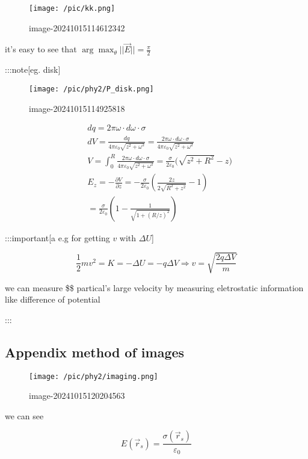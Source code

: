 \documentclass[
]{article}
\begin{document}
\begin{figure}
\centering
\texttt{[image: /pic/kk.png]}
\caption{image-20241015114612342}
\end{figure}

it's easy to see that \(\arg \max_{\theta } ||\vec E||=\frac{\pi}{2}\)

:::note{[}eg. disk{]}

\begin{figure}
\centering
\texttt{[image: /pic/phy2/P\_disk.png]}
\caption{image-20241015114925818}
\end{figure}

\[
\begin{aligned}
&dq=2\pi\omega\cdot d\omega\cdot\sigma \\
&dV=\frac{dq}{4\pi\varepsilon_{0}\sqrt{z^{2}+\omega^{2}}}=\frac{2\pi\omega\cdot d\omega\cdot\sigma}{4\pi\varepsilon_{0}\sqrt{z^{2}+\omega^{2}}} \\
&V=\int_{0}^{R}\frac{2\pi\omega\cdot d\omega\cdot\sigma}{4\pi\varepsilon_{0}\sqrt{z^{2}+\omega^{2}}}=\frac{\sigma}{2\varepsilon_{0}}\big(\sqrt{z^{2}+R^{2}}-z\big) \\
&E_{z}=-\frac{\partial V}{\partial z}=-\frac{\sigma}{2\varepsilon_{0}}(\frac{2z}{2\sqrt{R^{2}+z^{2}}}-1) \\
&=\frac{\sigma}{2\varepsilon_{0}}(1-\frac{1}{\sqrt{1+(R/z)^{2}}})
\end{aligned}
\]

:::important{[}a e.g for getting \(v\) with \(\Delta U\){]}

\[
\frac{1}{2}mv^2=K=-\Delta U=-q\Delta V\Rightarrow v=\sqrt{\frac{2q\Delta V}{m}}
\]

we can measure \$\alpha \$ partical's large velocity by measuring
eletrostatic information like difference of potential

:::

\hypertarget{appendix-method-of-images}{%
\subsection{Appendix method of images}\label{appendix-method-of-images}}

\begin{figure}
\centering
\texttt{[image: /pic/phy2/imaging.png]}
\caption{image-20241015120204563}
\end{figure}

we can see

\[
E(\vec r_s)=\frac{\sigma(\vec r_s)}{\varepsilon _0}
\]
\end{document}
